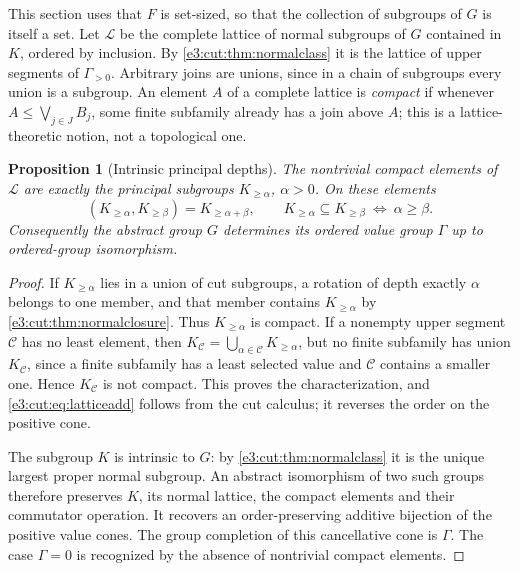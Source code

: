 \documentclass[11pt,letterpaper]{article}
\numberwithin{equation}{section}
\newtheorem{proposition}[proposition]{Proposition}
\theoremstyle{definition}
\theoremstyle{remark}
\newcommand{\comm}[2]{\left(#1,#2\right)}
\begin{document}
This section uses that $F$ is set-sized, so that the collection of subgroups of
$G$ is itself a set. Let $\mathcal L$ be the complete lattice of normal
subgroups of $G$ contained in $K$, ordered by inclusion. By
\cref{e3:cut:thm:normalclass} it is the lattice of upper segments of
$\Gamma_{>0}$. Arbitrary joins are unions, since in a chain of subgroups every
union is a subgroup. An element $A$ of a complete lattice is \emph{compact} if
whenever $A\le\bigvee_{j\in J}B_j$, some finite subfamily already has a join
above $A$; this is a lattice-theoretic notion, not a topological one.

\begin{proposition}[Intrinsic principal depths]\label{e3:cut:prop:compact}
The nontrivial compact elements of $\mathcal L$ are exactly the principal
subgroups $K_{\ge\alpha}$, $\alpha>0$. On these elements
\begin{equation}\label{e3:cut:eq:latticeadd}
 \comm{K_{\ge\alpha}}{K_{\ge\beta}}=K_{\ge\alpha+\beta},\qquad
 K_{\ge\alpha}\subseteq K_{\ge\beta}\ \Longleftrightarrow\ \alpha\ge\beta.
\end{equation}
Consequently the abstract group $G$ determines its ordered value group
$\Gamma$ up to ordered-group isomorphism.
\end{proposition}
\begin{proof}
If $K_{\ge\alpha}$ lies in a union of cut subgroups, a rotation of depth
exactly $\alpha$ belongs to one member, and that member contains
$K_{\ge\alpha}$ by \cref{e3:cut:thm:normalclosure}. Thus $K_{\ge\alpha}$ is
compact. If a nonempty upper segment $\mathcal C$ has no least element, then
$K_{\mathcal C}=\bigcup_{\alpha\in\mathcal C}K_{\ge\alpha}$, but no finite
subfamily has union $K_{\mathcal C}$, since a finite subfamily has a least
selected value and $\mathcal C$ contains a smaller one. Hence $K_{\mathcal C}$
is not compact. This proves the characterization, and
\cref{e3:cut:eq:latticeadd} follows from the cut calculus; it reverses the
order on the positive cone.

The subgroup $K$ is intrinsic to $G$: by \cref{e3:cut:thm:normalclass} it is
the unique largest proper normal subgroup. An abstract isomorphism of two such
groups therefore preserves $K$, its normal lattice, the compact elements and
their commutator operation. It recovers an order-preserving additive bijection
of the positive value cones. The group completion of this cancellative cone is
$\Gamma$. The case $\Gamma=0$ is recognized by the absence of nontrivial
compact elements.
\end{proof}
\end{document}
